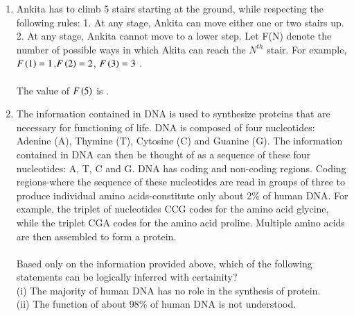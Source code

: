 \documentclass[journal]{IEEEtran}
\begin{document}
\begin{enumerate}[start=1]
\item %
Ankita has to climb 5 stairs starting at the ground, while respecting the following rules:
1. At any stage, Ankita can move either one or two stairs up.
2. At any stage, Ankita cannot move to a lower step.
Let F(N) denote the number of possible ways in which Akita can reach the $N^{th}$ stair. For example, $F\left(1\right)=1$,$F\left(2\right)=2$, $F\left(3\right)=3$ . \\
\\
The value of $F\left(5\right)$ is \underline{\hspace{1.5cm}} .
\begin{enumerate}
\end{enumerate}
\item %
The information contained in DNA is used to synthesize proteins that are necessary for functioning of life. DNA is composed of four nucleotides: Adenine (A), Thymine (T), Cytosine (C) and Guanine (G). The information contained in DNA can then be thought of as a sequence of these four nucleotides: A, T, C and G. DNA has coding and non-coding regions. Coding regions-where the sequence of these nucleotides are read in groups of three to produce individual amino acids-constitute only about 2\% of human DNA. For example, the triplet of nucleotides CCG codes for the amino acid glycine, while the triplet CGA codes for the amino acid proline. Multiple amino acids are then assembled to form a protein. \\
\\
Based only on the information provided above, which of the following statements can be logically inferred with certainity?\\
(i)  The majority of human DNA has no role in the synthesis of protein. \\
(ii) The function of about 98\% of human DNA is not understood.
\begin{enumerate}

\end{enumerate}
\end{enumerate}
\end{document}

